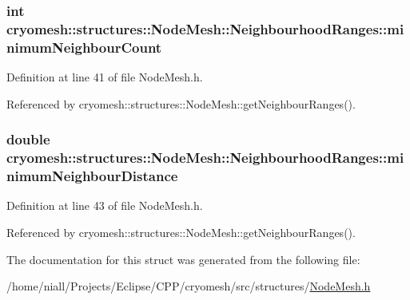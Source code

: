 \hypertarget{structcryomesh_1_1structures_1_1NodeMesh_1_1NeighbourhoodRanges_a4b876991aee7092aef9aa67806aaa1ce}{
\subsubsection[{minimum\-Neighbour\-Count}]{\setlength{\rightskip}{0pt plus 5cm}int {\bf cryomesh\-::structures\-::\-Node\-Mesh\-::\-Neighbourhood\-Ranges\-::minimum\-Neighbour\-Count}}}\label{structcryomesh_1_1structures_1_1NodeMesh_1_1NeighbourhoodRanges_a4b876991aee7092aef9aa67806aaa1ce}


\-Definition at line 41 of file \-Node\-Mesh.\-h.



\-Referenced by cryomesh\-::structures\-::\-Node\-Mesh\-::get\-Neighbour\-Ranges().

\hypertarget{structcryomesh_1_1structures_1_1NodeMesh_1_1NeighbourhoodRanges_a7d36869bd701062cb4305cb5d55a4741}{
\subsubsection[{minimum\-Neighbour\-Distance}]{\setlength{\rightskip}{0pt plus 5cm}double {\bf cryomesh\-::structures\-::\-Node\-Mesh\-::\-Neighbourhood\-Ranges\-::minimum\-Neighbour\-Distance}}}\label{structcryomesh_1_1structures_1_1NodeMesh_1_1NeighbourhoodRanges_a7d36869bd701062cb4305cb5d55a4741}


\-Definition at line 43 of file \-Node\-Mesh.\-h.



\-Referenced by cryomesh\-::structures\-::\-Node\-Mesh\-::get\-Neighbour\-Ranges().



\-The documentation for this struct was generated from the following file\-:\begin{DoxyCompactItemize}
\item 
/home/niall/\-Projects/\-Eclipse/\-C\-P\-P/cryomesh/src/structures/\hyperlink{NodeMesh_8h}{\-Node\-Mesh.\-h}\end{DoxyCompactItemize}
